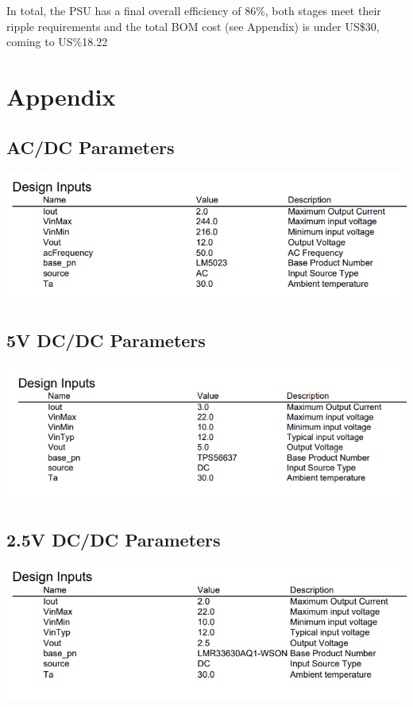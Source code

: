 \documentclass[11pt, a4]{article}
\begin{document}
In total, the PSU has a final overall efficiency of 86\%, both stages meet their ripple requirements and the total BOM cost (see Appendix) is under US\$30, coming to US\%18.22

\newpage
\section*{Appendix}
\subsection*{AC/DC Parameters}
\includegraphics[width=\textwidth]{img/acdc_param.png}
\subsection*{5V DC/DC Parameters}
\includegraphics[width=\textwidth]{img/5v_param.png}
\subsection*{2.5V DC/DC Parameters}
\includegraphics[width=\textwidth]{img/2-5V_param.png}
\newpage
\end{document}
